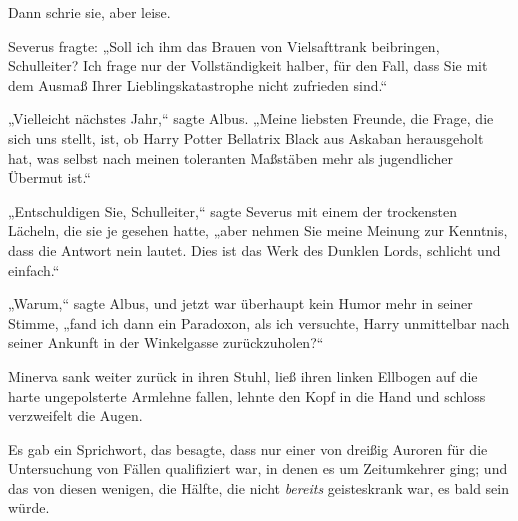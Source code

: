 Dann schrie sie, aber leise.

Severus fragte: „Soll ich ihm das Brauen von Vielsafttrank beibringen, Schulleiter? Ich frage nur der Vollständigkeit halber, für den Fall, dass Sie mit dem Ausmaß Ihrer Lieblingskatastrophe nicht zufrieden sind.“

„Vielleicht nächstes Jahr,“ sagte Albus. „Meine liebsten Freunde, die Frage, die sich uns stellt, ist, ob Harry Potter Bellatrix Black aus Askaban herausgeholt hat, was selbst nach meinen toleranten Maßstäben mehr als jugendlicher Übermut ist.“

„Entschuldigen Sie, Schulleiter,“ sagte Severus mit einem der trockensten Lächeln, die sie je gesehen hatte, „aber nehmen Sie meine Meinung zur Kenntnis, dass die Antwort nein lautet. Dies ist das Werk des Dunklen Lords, schlicht und einfach.“

„Warum,“ sagte Albus, und jetzt war überhaupt kein Humor mehr in seiner Stimme, „fand ich dann ein Paradoxon, als ich versuchte, Harry unmittelbar nach seiner Ankunft in der Winkelgasse zurückzuholen?“

Minerva sank weiter zurück in ihren Stuhl, ließ ihren linken Ellbogen auf die harte ungepolsterte Armlehne fallen, lehnte den Kopf in die Hand und schloss verzweifelt die Augen.

Es gab ein Sprichwort, das besagte, dass nur einer von dreißig Auroren für die Untersuchung von Fällen qualifiziert war, in denen es um Zeitumkehrer ging; und das von diesen wenigen, die Hälfte, die nicht \emph{bereits} geisteskrank war, es bald sein würde.

